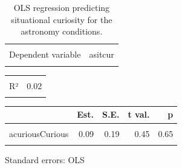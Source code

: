 \documentclass[
  letterpaper,
  DIV=11,
  numbers=noendperiod]{scrartcl}
\begin{document}
\hypertarget{tbl-asitcur}{}
\begin{table}[!h]
\caption{\label{tbl-asitcur}OLS regression predicting situational curiosity for the astronomy
conditions. }\tabularnewline

\centering
\begin{tabular}{lr}
\toprule
\cellcolor{gray!10}{Observations} & \cellcolor{gray!10}{235}\\
Dependent variable & asitcur\\
\cellcolor{gray!10}{Type} & \cellcolor{gray!10}{OLS linear regression}\\
\bottomrule
\end{tabular}
\end{table} \begin{table}[!h]
\centering
\begin{tabular}{lr}
\toprule
\cellcolor{gray!10}{F(2,232)} & \cellcolor{gray!10}{1.91}\\
R² & 0.02\\
\cellcolor{gray!10}{Adj. R²} & \cellcolor{gray!10}{0.01}\\
\bottomrule
\end{tabular}
\end{table} \begin{table}[!h]
\centering
\begin{threeparttable}
\begin{tabular}{lrrrr}
\toprule
  & Est. & S.E. & t val. & p\\
\midrule
\cellcolor{gray!10}{(Intercept)} & \cellcolor{gray!10}{4.36} & \cellcolor{gray!10}{0.17} & \cellcolor{gray!10}{26.37} & \cellcolor{gray!10}{0.00}\\
acuriousCurious & 0.09 & 0.19 & 0.45 & 0.65\\
\cellcolor{gray!10}{aresoResolution} & \cellcolor{gray!10}{-0.37} & \cellcolor{gray!10}{0.19} & \cellcolor{gray!10}{-1.91} & \cellcolor{gray!10}{0.06}\\
\bottomrule
\end{tabular}
\begin{tablenotes}
\item Standard errors: OLS
\end{tablenotes}
\end{threeparttable}
\end{table}
\end{document}
